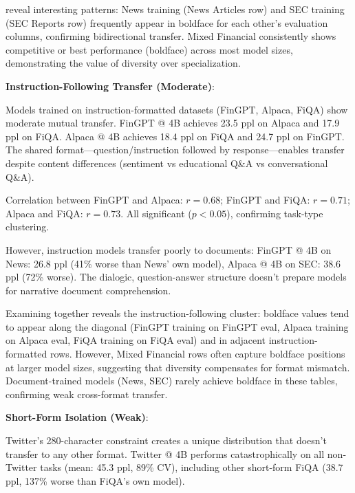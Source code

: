 



 reveal interesting patterns: News training (News Articles row) and SEC training (SEC Reports row) frequently appear in boldface for each other's evaluation columns, confirming bidirectional transfer. Mixed Financial consistently shows competitive or best performance (boldface) across most model sizes, demonstrating the value of diversity over specialization.

\textbf{Instruction-Following Transfer (Moderate)}:

Models trained on instruction-formatted datasets (FinGPT, Alpaca, FiQA) show moderate mutual transfer. FinGPT @ 4B achieves 23.5 ppl on Alpaca and 17.9 ppl on FiQA. Alpaca @ 4B achieves 18.4 ppl on FiQA and 24.7 ppl on FinGPT. The shared format—question/instruction followed by response—enables transfer despite content differences (sentiment vs educational Q\&A vs conversational Q\&A).

Correlation between FinGPT and Alpaca: $r = 0.68$; FinGPT and FiQA: $r = 0.71$; Alpaca and FiQA: $r = 0.73$. All significant ($p < 0.05$), confirming task-type clustering.

However, instruction models transfer poorly to documents: FinGPT @ 4B on News: 26.8 ppl (41\% worse than News' own model), Alpaca @ 4B on SEC: 38.6 ppl (72\% worse). The dialogic, question-answer structure doesn't prepare models for narrative document comprehension.







Examining  together reveals the instruction-following cluster: boldface values tend to appear along the diagonal (FinGPT training on FinGPT eval, Alpaca training on Alpaca eval, FiQA training on FiQA eval) and in adjacent instruction-formatted rows. However, Mixed Financial rows often capture boldface positions at larger model sizes, suggesting that diversity compensates for format mismatch. Document-trained models (News, SEC) rarely achieve boldface in these tables, confirming weak cross-format transfer.

\textbf{Short-Form Isolation (Weak)}:

Twitter's 280-character constraint creates a unique distribution that doesn't transfer to any other format. Twitter @ 4B performs catastrophically on all non-Twitter tasks (mean: 45.3 ppl, 89\% CV), including other short-form FiQA (38.7 ppl, 137\% worse than FiQA's own model).

